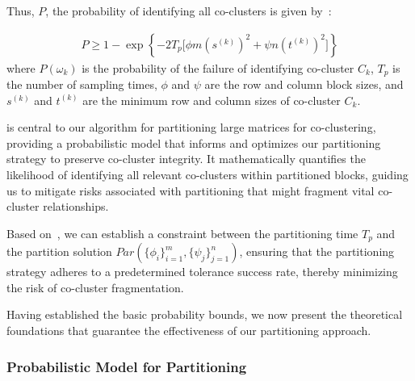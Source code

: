 \documentclass[journal]{IEEEtran}
\theoremstyle{definition}
\theoremstyle{remark} %
\begin{document}
Thus, $P$, the probability of identifying all co-clusters is given by~:

\begin{equation}
    \begin{split}
        P \ge 1 - \exp \left\{ -2 T_p \lbrack \phi m (s^{(k)})^2 + \psi n (t^{(k)})^2\rbrack  \right\} \label{eq:prob-of-identifying-all-co-clusters-sec}
    \end{split}
\end{equation}
where $P(\omega_k)$ is the probability of the failure of identifying co-cluster $C_k$, $T_p$ is the number of sampling times, $\phi$ and $\psi$ are the row and column block sizes, and $s^{(k)}$ and $t^{(k)}$ are the minimum row and column sizes of co-cluster $C_k$.

 is central to our algorithm for partitioning large matrices for co-clustering, providing a probabilistic model that informs and optimizes our partitioning strategy to preserve co-cluster integrity. It mathematically quantifies the likelihood of identifying all relevant co-clusters within partitioned blocks, guiding us to mitigate risks associated with partitioning that might fragment vital co-cluster relationships.

Based on~, we can establish a constraint between the partitioning time $T_p$ and the partition solution $Par(\{\phi_i\}_{i=1}^m, \{\psi_j\}_{j=1}^n)$, ensuring that the partitioning strategy adheres to a predetermined tolerance success rate, thereby minimizing the risk of co-cluster fragmentation.

Having established the basic probability bounds, we now present the theoretical foundations that guarantee the effectiveness of our partitioning approach.

\subsubsection{Probabilistic Model for Partitioning}
\label{subsec:probabilistic-model}
\end{document}
